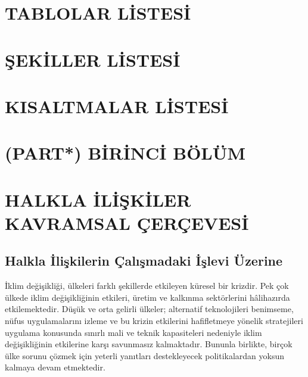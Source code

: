 \documentclass[
]{book}
\begin{document}
\hypertarget{tablolar-listesi}{%
\chapter*{TABLOLAR LİSTESİ}\label{tablolar-listesi}}

\hypertarget{ux15fekiller-listesi}{%
\chapter*{ŞEKİLLER LİSTESİ}\label{ux15fekiller-listesi}}

\hypertarget{kisaltmalar-listesi}{%
\chapter*{KISALTMALAR LİSTESİ}\label{kisaltmalar-listesi}}

\hypertarget{part-birinci-buxf6luxfcm}{%
\chapter{(PART*) BİRİNCİ BÖLÜM}\label{part-birinci-buxf6luxfcm}}

\hypertarget{intro}{%
\chapter{HALKLA İLİŞKİLER KAVRAMSAL ÇERÇEVESİ}\label{intro}}

\hypertarget{halkla-iliux15fkilerin-uxe7alux131ux15fmadaki-iux15flevi-uxfczerine}{%
\section{Halkla İlişkilerin Çalışmadaki İşlevi Üzerine}\label{halkla-iliux15fkilerin-uxe7alux131ux15fmadaki-iux15flevi-uxfczerine}}

İklim değişikliği, ülkeleri farklı şekillerde etkileyen küresel bir krizdir. Pek çok ülkede iklim değişikliğinin etkileri, üretim ve kalkınma sektörlerini hâlihazırda etkilemektedir. Düşük ve orta gelirli ülkeler; alternatif teknolojileri benimseme, nüfus uygulamalarını izleme ve bu krizin etkilerini hafifletmeye yönelik stratejileri uygulama konusunda sınırlı mali ve teknik kapasiteleri nedeniyle iklim değişikliğinin etkilerine karşı savunmasız kalmaktadır. Bununla birlikte, birçok ülke sorunu çözmek için yeterli yanıtları destekleyecek politikalardan yoksun kalmaya devam etmektedir. \citep{glasgow2018public}
\end{document}
